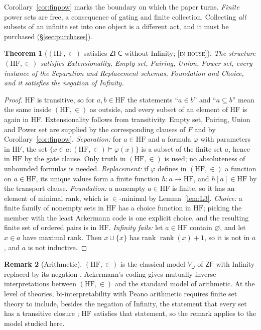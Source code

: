 \documentclass[11pt]{article}
\newcommand{\HF}{\mathrm{HF}}                 \newcommand{\rank}{\operatorname{rank}}
\newcommand{\Vfin}{V_{\omega}}
\newcommand{\gradetag}[1]{\textnormal{\textsc{[#1]}}}
\newcommand{\inhouse}{\gradetag{in-house}}
\newtheorem{theorem}{Theorem}[section]
\theoremstyle{definition}
\newtheorem{remark}[theorem]{Remark}
\begin{document}
\noindent Corollary~\ref{cor:finpow} marks the boundary on which the paper turns. \emph{Finite}
power sets are free, a consequence of gating and finite collection. Collecting \emph{all}
subsets of an infinite set into one object is a different act, and it must be purchased
(\S\ref{sec:purchases}).

\begin{theorem}[$(\HF,\in)$ satisfies $\mathsf{ZFC}$ without Infinity; \inhouse]\label{thm:hfsat}
The structure $(\HF,\in)$ satisfies Extensionality, Empty set, Pairing, Union, Power set, every
instance of the Separation and Replacement schemas, Foundation and Choice, and it satisfies the
negation of Infinity.
\end{theorem}

\begin{proof}
$\HF$ is transitive, so for $a,b\in\HF$ the statements ``$a\in b$'' and ``$a\subseteq b$'' mean
the same inside $(\HF,\in)$ as outside, and every subset of an element of $\HF$ is again in
$\HF$. Extensionality follows from transitivity. Empty set, Pairing, Union and Power set are
supplied by the corresponding clauses of $F$ and by Corollary~\ref{cor:finpow}.
\emph{Separation:} for $a\in\HF$ and a formula $\varphi$ with parameters in $\HF$, the set
$\{x\in a:(\HF,\in)\models\varphi(x)\}$ is a subset of the finite set $a$, hence in $\HF$ by the
gate clause. Only truth in $(\HF,\in)$ is used; no absoluteness of unbounded formulas is needed.
\emph{Replacement:} if $\varphi$ defines in $(\HF,\in)$ a function on $a\in\HF$, its unique values
form a finite function $h\colon a\to\HF$, and $h[a]\in\HF$ by the transport clause.
\emph{Foundation:} a nonempty $a\in\HF$ is finite, so it has an element of minimal rank, which is
$\in$-minimal by Lemma~\ref{lem:L3}. \emph{Choice:} a finite family of nonempty sets in $\HF$ has
a choice function in $\HF$; picking the member with the least Ackermann code is one explicit
choice, and the resulting finite set of ordered pairs is in $\HF$. \emph{Infinity fails:} let
$a\in\HF$ contain $\varnothing$, and let $x\in a$ have maximal rank. Then $x\cup\{x\}$ has rank
$\rank(x)+1$, so it is not in $a$, and $a$ is not inductive.
\end{proof}

\begin{remark}[Arithmetic]\label{rem:ackermann}
$(\HF,\in)$ is the classical model $\Vfin$ of $\mathsf{ZF}$ with Infinity replaced by its
negation \citep{Kunen2011}. Ackermann's coding \citep{Ackermann1937} gives mutually
inverse interpretations between $(\HF,\in)$ and the standard model of arithmetic. At the level of
theories, bi-interpretability with Peano arithmetic requires finite set theory to include, besides
the negation of Infinity, the statement that every set has a transitive closure
\citep{KayeWong2007}; $\HF$ satisfies that statement, so the remark applies to the model
studied here.
\end{remark}
\end{document}
